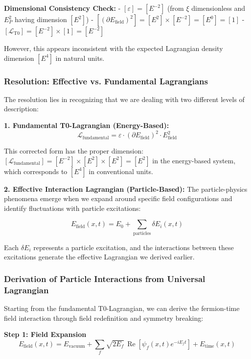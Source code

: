 \documentclass[12pt,a4paper]{article}
\begin{document}
	\textbf{Dimensional Consistency Check:}
	- $[\varepsilon] = [E^{-2}]$ (from $\xi$ dimensionless and $E_P^2$ having dimension $[E^2]$)
	- $[(\partial E_{\text{field}})^2] = [E^2] \times [E^{-2}] = [E^0] = [1]$
	- $[\mathcal{L}_{\text{T0}}] = [E^{-2}] \times [1] = [E^{-2}]$
	
	However, this appears inconsistent with the expected Lagrangian density dimension $[E^4]$ in natural units.
	
	\subsubsection{Resolution: Effective vs. Fundamental Lagrangians}
	
	The resolution lies in recognizing that we are dealing with two different levels of description:
	
	\textbf{1. Fundamental T0-Lagrangian (Energy-Based):}
	\begin{equation}
		\mathcal{L}_{\text{fundamental}} = \varepsilon \cdot (\partial E_{\text{field}})^2 \cdot E_{\text{field}}^2
	\end{equation}
	
	This corrected form has the proper dimension:
	$[\mathcal{L}_{\text{fundamental}}] = [E^{-2}] \times [E^2] \times [E^2] = [E^2]$ in the energy-based system, which corresponds to $[E^4]$ in conventional units.
	
	\textbf{2. Effective Interaction Lagrangian (Particle-Based):}
	The particle-physics phenomena emerge when we expand around specific field configurations and identify fluctuations with particle excitations:
	
	\begin{equation}
		E_{\text{field}}(x,t) = E_0 + \sum_{\text{particles}} \delta E_i(x,t)
	\end{equation}
	
	Each $\delta E_i$ represents a particle excitation, and the interactions between these excitations generate the effective Lagrangian we derived earlier.
	
	\subsubsection{Derivation of Particle Interactions from Universal Lagrangian}
	
	Starting from the fundamental T0-Lagrangian, we can derive the fermion-time field interaction through field redefinition and symmetry breaking:
	
	\textbf{Step 1: Field Expansion}
	\begin{equation}
		E_{\text{field}}(x,t) = E_{\text{vacuum}} + \sum_f \sqrt{2E_f} \, \operatorname{Re}[\psi_f(x,t) e^{-iE_f t}] + E_{\text{time}}(x,t)
	\end{equation}
	
\end{document}
